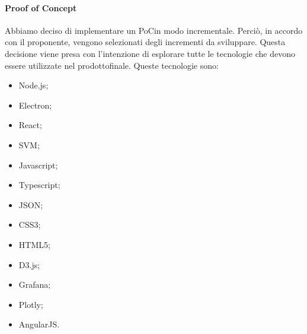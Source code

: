 			\paragraph*{Proof of Concept}
			Abbiamo deciso di implementare un PoC\glosp in modo incrementale. Perciò, in accordo con il proponente, vengono selezionati degli incrementi da sviluppare. Questa decisione viene presa con l'intenzione di esplorare tutte le tecnologie che devono essere utilizzate nel prodotto\glosp finale. Queste tecnologie sono:
			\begin{itemize}
				\item Node.js;
				\item Electron;
				\item React;
				\item SVM;
				\item Javascript;
				\item Typescript;
				\item JSON;
				\item CSS3;
				\item HTML5;
				\item D3.js;
				\item Grafana;
				\item Plotly;
				\item AngularJS.
			\end{itemize}
